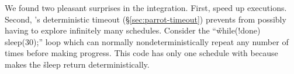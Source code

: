 We found two pleasant surprises in the
integration.  First, \computes speed up \dbug executions.  Second,
\parrot's deterministic timeout (\S\ref{sec:parrot-timeout}) prevents \dbug from
possibly having to explore infinitely many schedules.  Consider the
``\v{while(!done) sleep(30);}'' loop which can normally
nondeterministically repeat any number of times before making
progress.  This code has only one schedule with \ecosys because \parrot
makes the \v{sleep} return deterministically.





